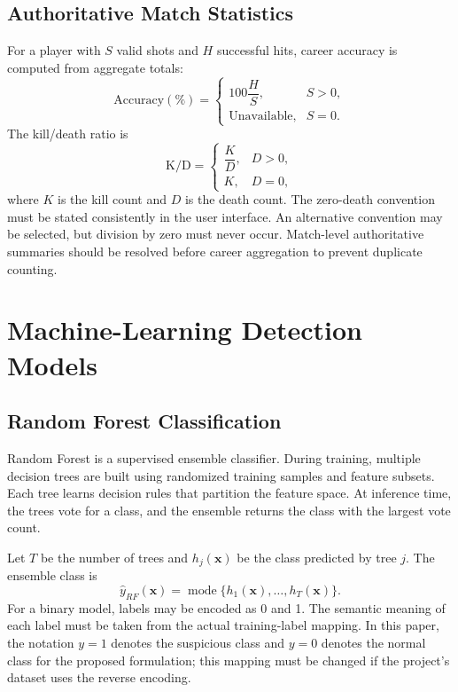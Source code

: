 \documentclass[conference]{IEEEtran}
\begin{document}
\subsection{Authoritative Match Statistics}
For a player with $S$ valid shots and $H$ successful hits, career accuracy is computed from aggregate totals:
\begin{equation}
\mathrm{Accuracy}(\%)=\begin{cases}
100\dfrac{H}{S}, & S>0,\\
\text{Unavailable}, & S=0.
\end{cases}
\label{eq:accuracy}
\end{equation}
The kill/death ratio is
\begin{equation}
\mathrm{K/D}=\begin{cases}
\dfrac{K}{D}, & D>0,\\
K, & D=0,
\end{cases}
\label{eq:kd}
\end{equation}
where $K$ is the kill count and $D$ is the death count. The zero-death convention must be stated consistently in the user interface. An alternative convention may be selected, but division by zero must never occur. Match-level authoritative summaries should be resolved before career aggregation to prevent duplicate counting.

\section{Machine-Learning Detection Models}
\subsection{Random Forest Classification}
Random Forest is a supervised ensemble classifier. During training, multiple decision trees are built using randomized training samples and feature subsets. Each tree learns decision rules that partition the feature space. At inference time, the trees vote for a class, and the ensemble returns the class with the largest vote count.

Let $T$ be the number of trees and $h_j(\mathbf{x})$ be the class predicted by tree $j$. The ensemble class is
\begin{equation}
\hat{y}_{RF}(\mathbf{x})=\operatorname{mode}\{h_1(\mathbf{x}),\ldots,h_T(\mathbf{x})\}.
\label{eq:rfclass}
\end{equation}
For a binary model, labels may be encoded as 0 and 1. The semantic meaning of each label must be taken from the actual training-label mapping. In this paper, the notation $y=1$ denotes the suspicious class and $y=0$ denotes the normal class for the proposed formulation; this mapping must be changed if the project's dataset uses the reverse encoding.
\end{document}

